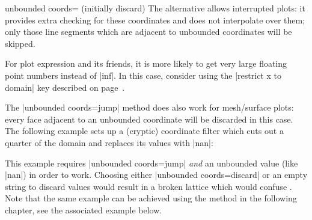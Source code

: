 {\begin{pgfplotskey}{unbounded coords= (initially discard)}
	The alternative  allows interrupted plots: it provides extra checking for these coordinates and does not interpolate over them; only those line segments which are adjacent to unbounded coordinates will be skipped. 
\begin{codeexample}[]
\end{codeexample}

	For plot expression and its friends, it is more likely to get very large floating point numbers instead of |inf|. In this case, consider using the |restrict x to domain| key described on page~\pageref{key:restrict:x:to:domain}.

	The |unbounded coords=jump| method does also work for mesh/surface plots: every face adjacent to an unbounded coordinate will be discarded in this case. The following example sets up a (cryptic) coordinate filter which cuts out a quarter of the domain and replaces its values with |nan|:

\pgfplotsexpensiveexample
\begin{codeexample}[]
\end{codeexample}
	\noindent This example requires |unbounded coords=jump| \emph{and} an unbounded value (like |nan|) in order to work. Choosing either |unbounded coords=discard| or an empty string to discard values would result in a broken lattice which would confuse \PGFPlots. Note that the same example can be achieved using the method in the following chapter, see the associated example below.
\end{pgfplotskey}

}
